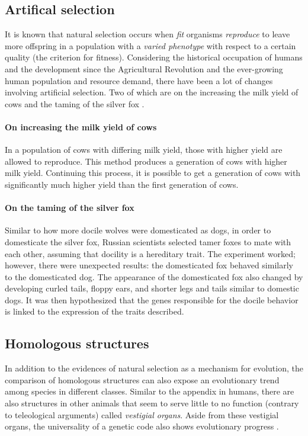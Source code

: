 \subsection{Artifical selection} %
It is known that natural selection occurs when \emph{fit} organisms \emph{reproduce} to leave more offspring in a population with a \emph{varied phenotype} with respect to a certain quality (the criterion for fitness).
Considering the historical occupation of humans and the development since the Agricultural Revolution and the ever-growing human population and resource demand, there have been a lot of changes involving artificial selection.
Two of which are on the increasing the milk yield of cows \cite{Ridley} and the taming of the silver fox \cite{biomain}.

\paragraph{On increasing the milk yield of cows}
In a population of cows with differing milk yield, those with higher yield are allowed to reproduce.
This method produces a generation of cows with higher milk yield.
Continuing this process, it is possible to get a generation of cows with significantly much higher yield than the first generation of cows.

\paragraph{On the taming of the silver fox}
Similar to how more docile wolves were domesticated as dogs, in order to domesticate the silver fox, Russian scientists selected tamer foxes to mate with each other, assuming that docility is a hereditary trait.
The experiment worked; however, there were unexpected results: the domesticated fox behaved similarly to the domesticated dog.
The appearance of the domesticated fox also changed by developing curled tails, floppy ears, and shorter legs and tails similar to domestic dogs.
It was then hypothesized that the genes responsible for the docile behavior is linked to the expression of the traits described.

\subsection{Homologous structures} %
In addition to the evidences of natural selection as a mechanism for evolution, the comparison of homologous structures can also expose an evolutionary trend among species in different classes.
Similar to the appendix in humans, there are also structures in other animals that seem to serve little to no function (contrary to teleological arguments) called \emph{vestigial organs}.
Aside from these vestigial organs, the universality of a genetic code also shows evolutionary progress \cite{Ridley}.

